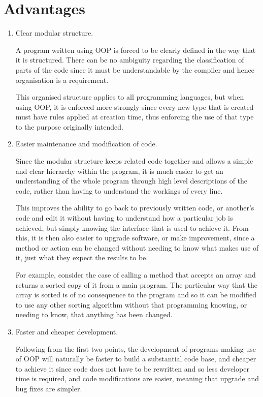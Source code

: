 \documentclass[11pt]{article} %
\begin{document}
\section{Advantages}
\begin{enumerate}
	\item Clear modular structure\cite{Abadi:1996:TO:547964}.

		A program written using OOP is forced to be clearly defined in the way
		that it is structured. There can be no ambiguity regarding the
		classification of parts of the code since it must be understandable by
		the compiler and hence organisation is a requirement.

		This organised structure applies to all programming languages, but when
		using OOP, it is enforced more strongly since every new type that is
		created must have rules applied at creation time, thus enforcing the
		use of that type to the purpose originally intended.

	\item Easier maintenance and modification of code.

		Since the modular structure keeps related code together and allows a
		simple and clear hierarchy within the program, it is much easier to get
		an understanding of the whole program through high level descriptions
		of the code, rather than having to understand the workings of every
		line.

		This improves the ability to go back to previously written code, or
		another's code and edit it without having to understand how a
		particular job is achieved, but simply knowing the interface that is
		used to achieve it. From this, it is then also easier to upgrade
		software, or make improvement, since a method or action can be changed
		without needing to know what makes use of it, just what they expect the
		results to be.

		For example, consider the case of calling a method that accepts an
		array and returns a sorted copy of it from a main program. The
		particular way that the array is sorted is of no consequence to the
		program and so it can be modified to use any other sorting algorithm
		without that programming knowing, or needing to know, that anything has
		been changed.

	\item Faster and cheaper development\cite{amblerscott}.

		Following from the first two points, the development of programs making
		use of OOP will naturally be faster to build a substantial code base,
		and cheaper to achieve it since code does not have to be rewritten and
		so less developer time is required, and code modifications are easier,
		meaning that upgrade and bug fixes are simpler.
\end{enumerate}
\end{document}

